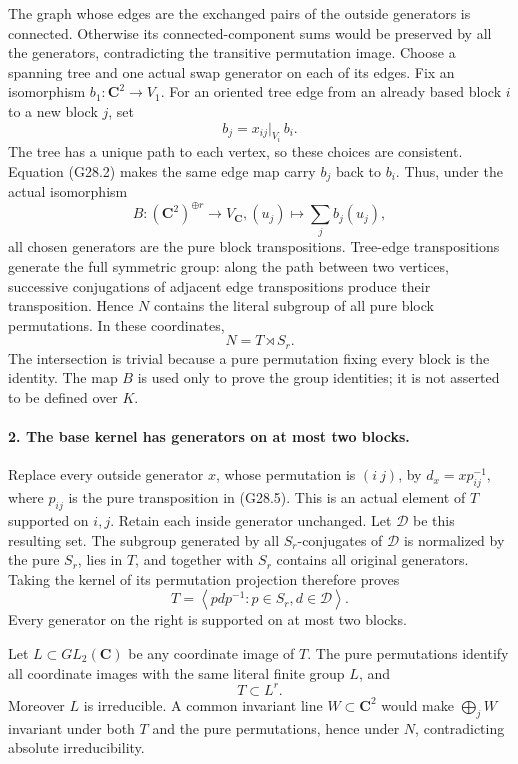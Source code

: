 The graph whose edges are the exchanged pairs of the outside
generators is connected. Otherwise its connected-component sums
would be preserved by all the generators, contradicting the
transitive permutation image. Choose a spanning tree and one
actual swap generator on each of its edges. Fix an isomorphism
\(b_1:\mathbf C^2\to V_1\). For an oriented tree edge from
an already based block \(i\) to a new block \(j\), set
\[
                        b_j=x_{ij}|_{V_i}\,b_i.             \tag{G28.3}
\]
The tree has a unique path to each vertex, so these choices are
consistent. Equation (G28.2) makes the same edge map carry
\(b_j\) back to \(b_i\). Thus, under the actual isomorphism
\[
       B:(\mathbf C^2)^{\oplus r}\longrightarrow V_{\mathbf C},
                   (u_j)\longmapsto\sum_j b_j(u_j),          \tag{G28.4}
\]
all chosen generators are the pure block transpositions.
Tree-edge transpositions generate the full symmetric group:
along the path between two vertices, successive conjugations
of adjacent edge transpositions produce their transposition.
Hence \(N\) contains the literal subgroup of all pure block
permutations. In these coordinates,
\[
                              N=T\rtimes S_r.               \tag{G28.5}
\]
The intersection is trivial because a pure permutation fixing
every block is the identity. The map \(B\) is used only to
prove the group identities; it is not asserted to be defined
over \(K\).

\paragraph{2. The base kernel has generators on at most two blocks.}
Replace every outside generator \(x\), whose permutation is
\((i\ j)\), by \(d_x=x p_{ij}^{-1}\), where \(p_{ij}\)
is the pure transposition in (G28.5). This is an actual element
of \(T\) supported on \(i,j\). Retain each inside generator
unchanged. Let \(\mathcal D\) be this resulting set.
The subgroup generated by all \(S_r\)-conjugates of
\(\mathcal D\) is normalized by the pure \(S_r\), lies
in \(T\), and together with \(S_r\) contains all original
generators. Taking the kernel of its permutation projection
therefore proves
\[
     T=\left\langle p d p^{-1}:p\in S_r,
                                      d\in\mathcal D\right\rangle.
                                                               \tag{G28.6}
\]
Every generator on the right is supported on at most two blocks.

Let \(L\subset GL_2(\mathbf C)\) be any coordinate image
of \(T\). The pure permutations identify all coordinate
images with the same literal finite group \(L\), and
\[
                              T\subset L^r.                 \tag{G28.7}
\]
Moreover \(L\) is irreducible. A common invariant line
\(W\subset\mathbf C^2\) would make \(\bigoplus_jW\)
invariant under both \(T\) and the pure permutations, hence
under \(N\), contradicting absolute irreducibility.

